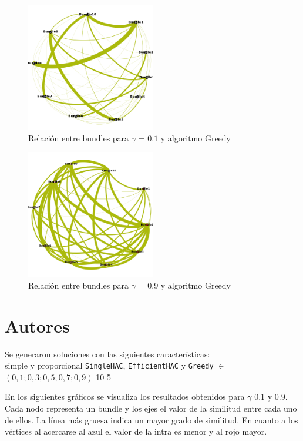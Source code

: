 \begin{figure}[H]
  \centering
    \includegraphics[width=0.5\textwidth]{resultados/papers/intra_inter/greedy01.png}
  \caption{Relación entre bundles para $\gamma$ = $0.1$ y algoritmo Greedy}
  \label{res:img-papers-gamma01-greedy}
\end{figure}

\begin{figure}[H]
  \centering
    \includegraphics[width=0.5\textwidth]{resultados/papers/intra_inter/greedy09.png}
  \caption{Relación entre bundles para $\gamma$ = $0.9$ y algoritmo Greedy}
  \label{res:img-papers-gamma09-greedy}
\end{figure}

\section{Autores}
Se generaron soluciones con las siguientes características:\\
\Solucion
{}
{simple y proporcional}
{\texttt{SingleHAC}, \texttt{EfficientHAC} y \texttt{Greedy}}
{$\in$ $(0,1; 0,3; 0,5; 0,7; 0,9)$}
{10}
{5}

En los siguientes gráficos se visualiza los resultados obtenidos para $\gamma$ 0.1 y 0.9. Cada 
nodo representa un bundle y los ejes el valor de la similitud entre cada uno de ellos. La línea más 
gruesa indica un mayor grado de similitud. En cuanto a los vértices al acercarse al azul el valor 
de la intra es menor y al rojo mayor.


